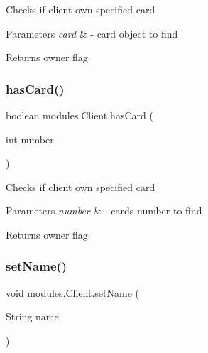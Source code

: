 Checks if client own specified card 
\begin{DoxyParams}{Parameters}
{\em card} & -\/ card object to find \\
\hline
\end{DoxyParams}
\begin{DoxyReturn}{Returns}
owner flag 
\end{DoxyReturn}
\mbox{\label{classmodules_1_1_client_a85eedfbdd0cdde608d7ce84aeb215e52}} 
\subsubsection{\texorpdfstring{has\+Card()}{hasCard()}\hspace{0.1cm}{\footnotesize\ttfamily [2/2]}}
{\footnotesize\ttfamily boolean modules.\+Client.\+has\+Card (\begin{DoxyParamCaption}\item[{int}]{number }\end{DoxyParamCaption})\hspace{0.3cm}{\ttfamily [inline]}}

Checks if client own specified card 
\begin{DoxyParams}{Parameters}
{\em number} & -\/ card\textquotesingle{}s number to find \\
\hline
\end{DoxyParams}
\begin{DoxyReturn}{Returns}
owner flag 
\end{DoxyReturn}
\mbox{\label{classmodules_1_1_client_ae4fbf557127b160ce3de90af49bc3ff9}} 
\subsubsection{\texorpdfstring{set\+Name()}{setName()}}
{\footnotesize\ttfamily void modules.\+Client.\+set\+Name (\begin{DoxyParamCaption}\item[{String}]{name }\end{DoxyParamCaption})\hspace{0.3cm}{\ttfamily [inline]}}


